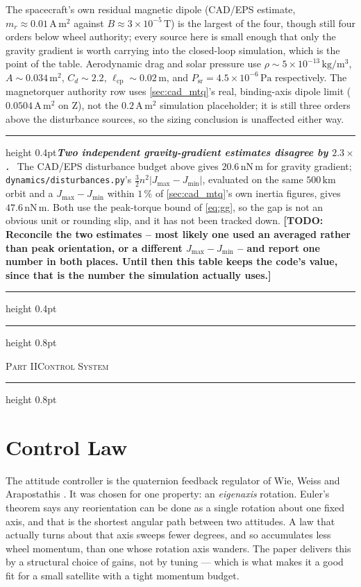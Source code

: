 \documentclass[conference,10pt,a4paper]{IEEEtran}
\newcommand{\remarkrule}{\par\nobreak\vspace{2pt}%
  \hrule height 0.4pt\vspace{4pt}\nobreak}
\newenvironment{cautionbox}[1][Caveat]
  {\par\medskip\remarkrule\noindent\small\textbf{\textit{#1.}}\ \ignorespaces}
  {\par\vspace{3pt}\hrule height 0.4pt\par\medskip\ignorespacesafterend}
\newcommand{\TODO}[1]{\textbf{[TODO: #1]}}
\newcommand{\TODO}[1]{}
\newcommand{\reportpart}[2]{%
  \par\medskip\noindent
  \hrule height 0.8pt\vspace{3pt}
  \centerline{\footnotesize\scshape Part #1\quad\textbar\quad #2}
  \vspace{3pt}\hrule height 0.8pt
  \par\medskip}
\newcommand{\unit}[1]{\ensuremath{\,\mathrm{#1}}}
\begin{document}
The spacecraft's own residual magnetic dipole (CAD/EPS estimate,
$m_r\approx0.01\unit{A\,m^2}$ against $B\approx3\times10^{-5}\unit{T}$) is the
largest of the four, though still four orders below wheel authority; every
source here is small enough that only the gravity gradient is worth carrying
into the closed-loop simulation, which is the point of the table. Aerodynamic
drag and solar pressure use $\rho\sim5\times10^{-13}\unit{kg/m^3}$,
$A\sim0.034\unit{m^2}$, $C_d\sim2.2$, $\ell_\text{cp}\sim0.02\unit{m}$, and
$P_\text{sr}=4.5\times10^{-6}\unit{Pa}$ respectively. The magnetorquer
authority row uses \cref{sec:cad_mtq}'s real, binding-axis dipole limit
($0.0504\unit{A\,m^2}$ on Z), not the $0.2\unit{A\,m^2}$ simulation placeholder;
it is still three orders above the disturbance sources, so the sizing
conclusion is unaffected either way.

\begin{cautionbox}[Two independent gravity-gradient estimates disagree by $2.3\times$]
The CAD/EPS disturbance budget above gives $20.6\unit{nN\,m}$ for gravity
gradient; \texttt{dynamics/disturbances.py}'s
$\tfrac{3}{2}n^2|J_\text{max}-J_\text{min}|$, evaluated on the same $500\unit{km}$
orbit and a $J_\text{max}-J_\text{min}$ within $1\,\%$ of \cref{sec:cad_mtq}'s
own inertia figures, gives $47.6\unit{nN\,m}$. Both use the peak-torque bound
of \cref{eq:gg}, so the gap is not an obvious unit or rounding slip, and it has
not been tracked down. \TODO{Reconcile the two estimates -- most likely one
used an averaged rather than peak orientation, or a different $J_\text{max}-J_
\text{min}$ -- and report one number in both places. Until then this table
keeps the code's value, since that is the number the simulation actually
uses.}
\end{cautionbox}

\reportpart{II}{Control System}

\section{Control Law}
\label{sec:control}

The attitude controller is the quaternion feedback regulator of Wie, Weiss and
Arapostathis \cite{wie1989}. It was chosen for one property: an
\emph{eigenaxis} rotation. Euler's theorem says any reorientation can be done
as a single rotation about one fixed axis, and that is the shortest angular
path between two attitudes. A law that actually turns about that axis sweeps
fewer degrees, and so accumulates less wheel momentum, than one whose rotation
axis wanders. The paper delivers this by a structural choice of gains, not by
tuning --- which is what makes it a good fit for a small satellite with a
tight momentum budget.
\end{document}

